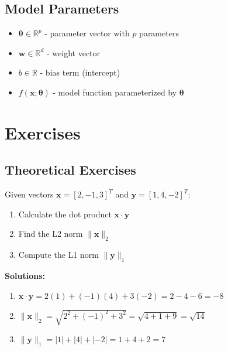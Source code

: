\documentclass{article}
\providecommand{\vx}{\mathbf{x}}
\providecommand{\vy}{\mathbf{y}}
\providecommand{\vw}{\mathbf{w}}
\providecommand{\vtheta}{\boldsymbol{\theta}}
\providecommand{\Real}{\mathbb{R}}
\newcounter{exercise}
\begin{document}
\subsection{Model Parameters}
\begin{itemize}
    \item $\vtheta \in \Real^p$ - parameter vector with $p$ parameters
    \item $\vw \in \Real^d$ - weight vector
    \item $b \in \Real$ - bias term (intercept)
    \item $f(\vx; \vtheta)$ - model function parameterized by $\vtheta$
\end{itemize}

\section{Exercises}

\subsection{Theoretical Exercises}

\begin{tcolorbox}[colback=gray!5!white,colframe=gray!75!black,title=Exercise \stepcounter{exercise}\#\theexercise: Vector Operations]
Given vectors $\vx = [2, -1, 3]^T$ and $\vy = [1, 4, -2]^T$:
\begin{enumerate}[label=(\alph*)]
    \item Calculate the dot product $\vx \cdot \vy$
    \item Find the L2 norm $\|\vx\|_2$
    \item Compute the L1 norm $\|\vy\|_1$
\end{enumerate}

\textbf{Solutions:}
\begin{enumerate}[label=(\alph*)]
    \item $\vx \cdot \vy = 2(1) + (-1)(4) + 3(-2) = 2 - 4 - 6 = -8$
    \item $\|\vx\|_2 = \sqrt{2^2 + (-1)^2 + 3^2} = \sqrt{4 + 1 + 9} = \sqrt{14}$
    \item $\|\vy\|_1 = |1| + |4| + |-2| = 1 + 4 + 2 = 7$
\end{enumerate}
\end{tcolorbox}
\end{document}
